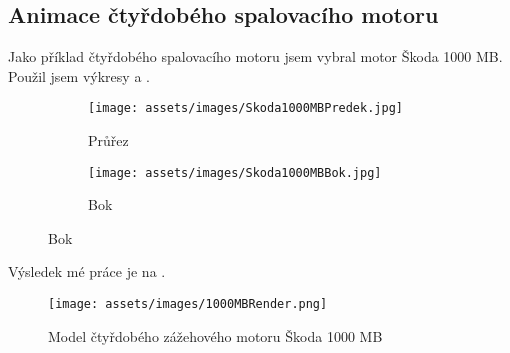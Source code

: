 \subsection{Animace čtyřdobého spalovacího motoru}
{Jako příklad čtyřdobého spalovacího motoru jsem vybral motor Škoda 1000 MB. Použil jsem výkresy  a .}
\cite{AUTOMOBIL:Skoda1000MBLegendaSlavi60Let}
\begin{figure}[H]
    \begingroup
    \makeatletter
    \renewcommand\thesubfigure{\thefigure~--~\@nameuse{subfiglabel@\alph{subfigure}}}
    \newcommand{\subfiglabel@a}{vlevo}
    \newcommand{\subfiglabel@b}{vpravo}
    \captionsetup[subfigure]{labelformat=simple, labelsep=colon}
    \renewcommand\p@subfigure{}
    \makeatother
    \centering
    \begin{subfigure}{.5\textwidth}
        \centering
        \texttt{[image: assets/images/Skoda1000MBPredek.jpg]}
        \caption{Průřez}
        \label{obr:1000MBvykresyPrurez}
    \end{subfigure}%
    \begin{subfigure}{.5\textwidth}
        \centering
        \texttt{[image: assets/images/Skoda1000MBBok.jpg]}
        \caption{Bok}
        \label{obr:1000MBvykresyBok}
    \end{subfigure}
    \endgroup
\end{figure}
{Výsledek mé práce je na .}
\begin{figure}[H]
    \centering
    \texttt{[image: assets/images/1000MBRender.png]}
    \caption{Model čtyřdobého zážehového motoru Škoda 1000 MB \jaObr}
    \label{obr:1000MBRender}
\end{figure}
\newpage
